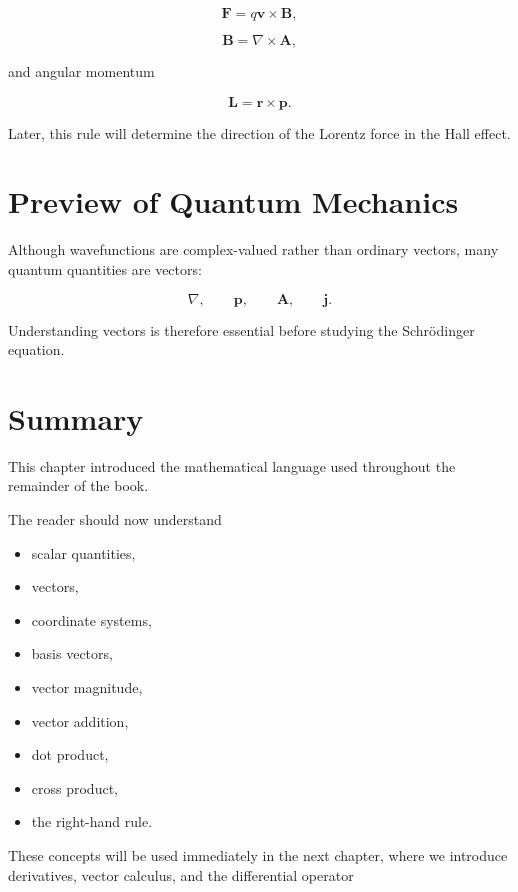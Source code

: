 \documentclass[11pt,a4paper,openany]{book}
\begin{document}
\[
\mathbf F=q\mathbf v\times\mathbf B,
\]

\[
\mathbf B=\nabla\times\mathbf A,
\]

and angular momentum

\[
\mathbf L
=
\mathbf r\times\mathbf p.
\]

Later, this rule will determine the direction of the Lorentz force in the Hall effect.




\section{Preview of Quantum Mechanics}

Although wavefunctions are complex-valued rather than ordinary vectors,
many quantum quantities are vectors:

\[
\nabla,
\qquad
\mathbf p,
\qquad
\mathbf A,
\qquad
\mathbf j.
\]

Understanding vectors is therefore essential before studying the Schrödinger equation.


\section{Summary}

This chapter introduced the mathematical language used throughout the remainder of the book.

The reader should now understand

\begin{itemize}
	\item scalar quantities,
	\item vectors,
	\item coordinate systems,
	\item basis vectors,
	\item vector magnitude,
	\item vector addition,
	\item dot product,
	\item cross product,
	\item the right-hand rule.
\end{itemize}

These concepts will be used immediately in the next chapter, where we introduce derivatives, vector calculus, and the differential operator
\end{document}
